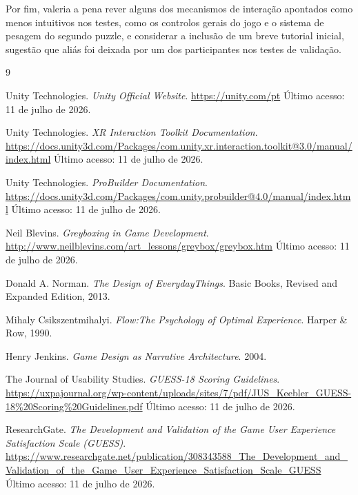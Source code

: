 \documentclass[a4paper, 12pt]{book}
\begin{document}
Por fim, valeria a pena rever alguns dos mecanismos de interação apontados
como menos intuitivos nos testes, como os controlos gerais do jogo e o
sistema de pesagem do segundo puzzle, e considerar a inclusão de um breve
tutorial inicial, sugestão que aliás foi deixada por um dos participantes
nos testes de validação.
\begin{thebibliography}{9}

Unity Technologies.
\textit{Unity Official Website}.
\url{https://unity.com/pt}
Último acesso: 11 de julho de 2026.

Unity Technologies.
\textit{XR Interaction Toolkit Documentation}.
\url{https://docs.unity3d.com/Packages/com.unity.xr.interaction.toolkit@3.0/manual/index.html}
Último acesso: 11 de julho de 2026.

Unity Technologies.
\textit{ProBuilder Documentation}.
\url{https://docs.unity3d.com/Packages/com.unity.probuilder@4.0/manual/index.html}
Último acesso: 11 de julho de 2026.

Neil Blevins.
\textit{Greyboxing in Game Development}.
\url{http://www.neilblevins.com/art_lessons/greybox/greybox.htm}
Último acesso: 11 de julho de 2026.

Donald A. Norman. 
\textit{The Design of EverydayThings}. 
Basic Books, Revised and Expanded Edition, 2013.

Mihaly Csikszentmihalyi. 
\textit{Flow:The Psychology of Optimal Experience}. 
Harper \& Row, 1990.

Henry Jenkins. 
\textit{Game Design as Narrative Architecture}. 
2004.

The Journal of Usability Studies.
\textit{GUESS-18 Scoring Guidelines}.
\url{https://uxpajournal.org/wp-content/uploads/sites/7/pdf/JUS_Keebler_GUESS-18%20Scoring%20Guidelines.pdf}
Último acesso: 11 de julho de 2026.

ResearchGate.
\textit{The Development and Validation of the Game User Experience Satisfaction Scale (GUESS)}.
\url{https://www.researchgate.net/publication/308343588_The_Development_and_Validation_of_the_Game_User_Experience_Satisfaction_Scale_GUESS}
Último acesso: 11 de julho de 2026.


\end{thebibliography}
\end{document}
